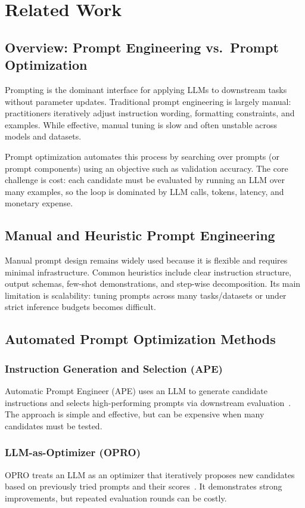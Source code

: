 \chapter{Related Work}

\section{Overview: Prompt Engineering vs.\ Prompt Optimization}
Prompting is the dominant interface for applying LLMs to downstream tasks without parameter updates. Traditional prompt engineering is largely manual: practitioners iteratively adjust instruction wording, formatting constraints, and examples. While effective, manual tuning is slow and often unstable across models and datasets.

Prompt optimization automates this process by searching over prompts (or prompt components) using an objective such as validation accuracy. The core challenge is cost: each candidate must be evaluated by running an LLM over many examples, so the loop is dominated by LLM calls, tokens, latency, and monetary expense.

\section{Manual and Heuristic Prompt Engineering}
Manual prompt design remains widely used because it is flexible and requires minimal infrastructure. Common heuristics include clear instruction structure, output schemas, few-shot demonstrations, and step-wise decomposition. Its main limitation is scalability: tuning prompts across many tasks/datasets or under strict inference budgets becomes difficult.

\section{Automated Prompt Optimization Methods}
\subsection{Instruction Generation and Selection (APE)}
Automatic Prompt Engineer (APE) uses an LLM to generate candidate instructions and selects high-performing prompts via downstream evaluation~\citep{zhou2022ape}. The approach is simple and effective, but can be expensive when many candidates must be tested.

\subsection{LLM-as-Optimizer (OPRO)}
OPRO treats an LLM as an optimizer that iteratively proposes new candidates based on previously tried prompts and their scores~\citep{yang2023opro}. It demonstrates strong improvements, but repeated evaluation rounds can be costly.

